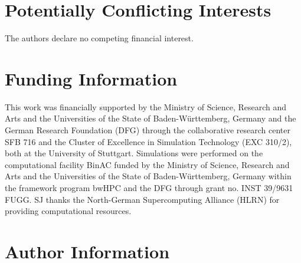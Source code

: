 \documentclass[9pt,lessons]{livecoms}
\newcommand{\githubrepository}{\url{https://github.com/myaccount/homegithubrepository}}  %
\begin{document}

\section{Potentially Conflicting Interests}

The authors declare no competing financial interest.

\section{Funding Information}
This work was financially supported by the Ministry of Science, Research and Arts and the Universities of the State of Baden-W\"urttemberg, Germany and the German Research Foundation (DFG) 
through the collaborative research center SFB 716 and the Cluster of Excellence in Simulation Technology (EXC 310/2), both at the University of Stuttgart. 
Simulations were performed on the computational facility BinAC funded by the Ministry of Science, Research and Arts and the Universities of the State of Baden-W\"urttemberg, Germany within 
the framework program bwHPC and the DFG through grant no. INST 39/9631 FUGG.
SJ thanks the North-German Supercomputing Alliance (HLRN) for providing computational resources.

\section*{Author Information}
\makeorcid

\nocite{*} %



\appendix
\setcounter{table}{0}
\renewcommand{\thetable}{A\arabic{table}}
\end{document}
